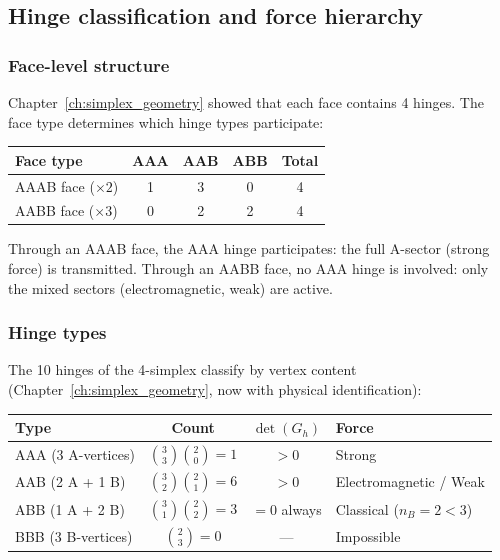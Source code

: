 \subsection{Hinge classification and force hierarchy}

\subsubsection{Face-level structure}

Chapter~\ref{ch:simplex_geometry} showed that each face contains 4 hinges. The face type determines which hinge types participate:

\begin{center}
\begin{tabular}{lcccc}
\hline
Face type & AAA & AAB & ABB & Total \\
\hline
AAAB face ($\times 2$) & 1 & 3 & 0 & 4 \\
AABB face ($\times 3$) & 0 & 2 & 2 & 4 \\
\hline
\end{tabular}
\end{center}

Through an AAAB face, the AAA hinge participates: the full A-sector (strong force) is transmitted. Through an AABB face, no AAA hinge is involved: only the mixed sectors (electromagnetic, weak) are active.

\subsubsection{Hinge types}

The 10 hinges of the 4-simplex classify by vertex content (Chapter~\ref{ch:simplex_geometry}, now with physical identification):

\begin{center}
\begin{tabular}{lccl}
\hline
Type & Count & $\det(G_h)$ & Force \\
\hline
AAA (3 A-vertices) & $\binom{3}{3}\binom{2}{0} = 1$ & $> 0$ & Strong \\
AAB (2 A + 1 B) & $\binom{3}{2}\binom{2}{1} = 6$ & $> 0$ & Electromagnetic / Weak \\
ABB (1 A + 2 B) & $\binom{3}{1}\binom{2}{2} = 3$ & $= 0$ always & Classical ($n_B = 2 < 3$) \\
BBB (3 B-vertices) & $\binom{2}{3} = 0$ & --- & Impossible \\
\hline
\end{tabular}
\end{center}

